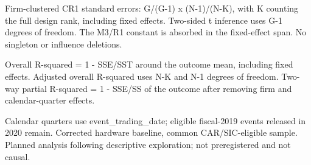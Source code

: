 \documentclass[10pt]{article}
\begin{document}
Firm-clustered CR1 standard errors: G/(G-1) x (N-1)/(N-K), with K counting the full design rank, including fixed effects. Two-sided t inference uses G-1 degrees of freedom. The M3/R1 constant is absorbed in the fixed-effect span. No singleton or influence deletions.


Overall R-squared = 1 - SSE/SST around the outcome mean, including fixed effects. Adjusted overall R-squared uses N-K and N-1 degrees of freedom. Two-way partial R-squared = 1 - SSE/SS of the outcome after removing firm and calendar-quarter effects.


Calendar quarters use event_trading_date; eligible fiscal-2019 events released in 2020 remain. Corrected hardware baseline, common CAR/SIC-eligible sample. Planned analysis following descriptive exploration; not preregistered and not causal.
\end{document}
